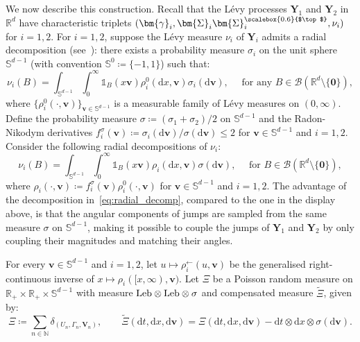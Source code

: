 \documentclass[en,oneside,bbfont,article]{amsart}
\theoremstyle{remark}
\theoremstyle{definition}
\theoremstyle{definition}
\newcommand\N{\mathbb{N}}
\newcommand\Sp{\mathbb{S}}
\newcommand\R{\mathbb{R}}
\newcommand\1{\mathds{1}}
\newcommand{\Leb}{\text{\normalfont Leb}}
\newcommand\la{\leftarrow}
\renewcommand\le{\leqslant}
\newcommand{\D}{\mathrm{d}}
\newcommand{\wt}[1]{\widetilde{#1}}
\newcommand{\tra}{{\scalebox{0.6}{$\top$}}}
\begin{document}
We now describe this construction. Recall that the L\'evy processes $\bm{Y}_1$ and $\bm{Y}_2$ in $\R^d$ have characteristic triplets $(\bm{\gamma}_{i},\bm{\Sigma}_{i}\bm{\Sigma}_{i}^\tra,\nu_{i})$ for $i=1,2$. For $i=1,2$, suppose the L\'evy measure $\nu_{i}$ of $\bm{Y}_i$ admits a radial decomposition (see~\cite[p.~282]{MR647969}): there exists a probability measure $\sigma_{i}$ on the unit sphere $\Sp^{d-1}$ (with convention $\Sp^{0}\coloneqq\{-1,1\}$) such that:
\[
\nu_{i}(B)= \int_{\Sp^{d-1}}\int_0^\infty \1_{B}(x\bm{v})\rho_{i}^0(\D x,\bm{v})\sigma_{i}(\D \bm{v}), \quad \text{ for any } B\in \mathcal{B}(\R^d \setminus \{\bm{0}\}),
\] where $\{\rho^0_{i}(\cdot,\bm{v})\}_{\bm{v}\in \Sp^{d-1}}$ is a measurable family of L\'evy measures on $(0,\infty)$. Define the probability measure $\sigma \coloneqq (\sigma_{1}+\sigma_{2})/2$ on $\Sp^{d-1}$ and the Radon-Nikodym derivatives $f^\sigma_{i}(\bm{v})\coloneqq \sigma_{i}(\D\bm{v})/\sigma(\D\bm{v})\le 2$ for $\bm{v} \in \Sp^{d-1}$ and $i=1,2$. Consider the following radial decompositions of $\nu_{i}$: 
\begin{equation}\label{eq:radial_decomp}
\nu_{i}(B)= \int_{\Sp^{d-1}}\int_0^\infty \1_{B}(x\bm{v})\rho_{i}(\D x,\bm{v})\sigma(\D \bm{v}), \quad \text{ for }B\in \mathcal{B}(\R^d \setminus \{\bm{0}\}), 
\end{equation} where $\rho_{i}(\cdot,\bm{v})\coloneqq f^\sigma_{i}(\bm{v})\rho_{i}^0(\cdot,\bm{v})$ for $\bm{v} \in \Sp^{d-1}$ and $i=1,2$. The advantage of the decomposition in~\eqref{eq:radial_decomp}, compared to the one in the display above, is that the angular components of jumps are sampled from the same measure $\sigma$ on $\Sp^{d-1}$, making it possible to couple the jumps of $\bm{Y}_1$ and $\bm{Y}_2$ by only coupling their magnitudes and matching their angles. 

For every $\bm{v}\in \Sp^{d-1}$ and $i=1,2$, let $u\mapsto\rho_{i}^{\la}(u,\bm{v})$ be the generalised right-continuous inverse of $x\mapsto\rho_{i}([x,\infty),\bm{v})$. %
Let $\Xi$ be a Poisson random measure on $\R_+\times\R_+\times \Sp^{d-1}$ with measure $\Leb\otimes\Leb\otimes\sigma$ and compensated measure $\wt\Xi$, given by:
\begin{equation}\label{eq:marked_PPP_cmnotonic}
    \Xi\coloneqq \sum_{n \in \N}\delta_{(U_n,\Gamma_n,\bm{V}_n)}, \qquad \wt\Xi(\D t,\D x,\D \bm{v})=\Xi(\D t, \D x, \D \bm{v})-\D t \otimes \D x \otimes \sigma(\D \bm{v}).
\end{equation} 
\end{document}

